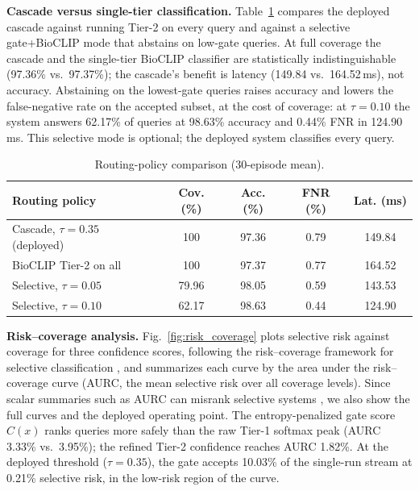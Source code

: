 \documentclass[preprint,12pt]{elsarticle}
\begin{document}
\textbf{Cascade versus single-tier classification.} Table~\ref{tab:gate_scenario} compares the deployed cascade against running Tier-2 on every query and against a selective gate+BioCLIP mode that abstains on low-gate queries. At full coverage the cascade and the single-tier BioCLIP classifier are statistically indistinguishable (97.36\% vs.\ 97.37\%); the cascade's benefit is latency (149.84 vs.\ 164.52\,ms), not accuracy. Abstaining on the lowest-gate queries raises accuracy and lowers the false-negative rate on the accepted subset, at the cost of coverage: at $\tau=0.10$ the system answers 62.17\% of queries at 98.63\% accuracy and 0.44\% FNR in 124.90\,ms. This selective mode is optional; the deployed system classifies every query.

\begin{table}[htbp]
\caption{Routing-policy comparison (30-episode mean).}
\label{tab:gate_scenario}
\centering

\footnotesize
\setlength{\tabcolsep}{3pt}
\begin{tabular*}{\columnwidth}{@{\extracolsep{\fill}}lcccc}
\toprule
\textbf{Routing policy} & \textbf{Cov. (\%)} & \textbf{Acc. (\%)} & \textbf{FNR (\%)} & \textbf{Lat. (ms)} \\
\midrule
Cascade, $\tau=0.35$ (deployed) & 100 & 97.36 & 0.79 & 149.84 \\
BioCLIP Tier-2 on all & 100 & 97.37 & 0.77 & 164.52 \\
Selective, $\tau=0.05$ & 79.96 & 98.05 & 0.59 & 143.53 \\
Selective, $\tau=0.10$ & 62.17 & 98.63 & 0.44 & 124.90 \\
\bottomrule
\end{tabular*}
\end{table}

\textbf{Risk--coverage analysis.} Fig.~\ref{fig:risk_coverage} plots selective risk against coverage for three confidence scores, following the risk--coverage framework for selective classification \cite{geifman2017selective}, and summarizes each curve by the area under the risk--coverage curve (AURC, the mean selective risk over all coverage levels). Since scalar summaries such as AURC can misrank selective systems \cite{traub2024overcoming}, we also show the full curves and the deployed operating point. The entropy-penalized gate score $C(x)$ ranks queries more safely than the raw Tier-1 softmax peak (AURC 3.33\% vs.\ 3.95\%); the refined Tier-2 confidence reaches AURC 1.82\%. At the deployed threshold ($\tau=0.35$), the gate accepts 10.03\% of the single-run stream at 0.21\% selective risk, in the low-risk region of the curve.
\end{document}
